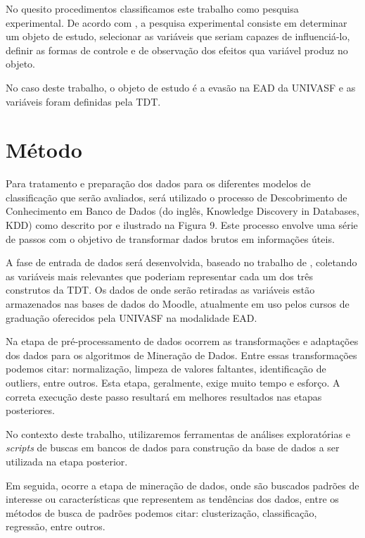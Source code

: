 No quesito procedimentos classificamos este trabalho como pesquisa experimental.
De acordo com , a pesquisa experimental consiste em
determinar um objeto de estudo, selecionar as variáveis que seriam capazes de
influenciá-lo, definir as formas de controle e de observação dos efeitos  qua
variável produz no objeto.

No caso deste trabalho, o objeto de estudo é a evasão na EAD da UNIVASF e as
variáveis foram definidas pela TDT.

\section{Método}

Para tratamento e preparação dos dados para os diferentes modelos de
classificação que serão avaliados, será utilizado o processo de Descobrimento de
Conhecimento em Banco de Dados (do inglês, Knowledge Discovery in Databases,
KDD) como descrito por  e ilustrado na Figura 9.
Este processo envolve uma série de passos com o objetivo de transformar dados
brutos em informações úteis.


A fase de entrada de dados será desenvolvida, baseado no trabalho de
, coletando as variáveis mais relevantes que
poderiam representar cada um dos três construtos da TDT. Os dados de onde serão
retiradas as variáveis estão armazenados nas bases de dados do Moodle,
atualmente em uso pelos cursos de graduação oferecidos pela UNIVASF na
modalidade EAD.

Na etapa de pré-processamento de dados ocorrem as transformações e adaptações
dos dados para os algoritmos de Mineração de Dados. Entre essas transformações
podemos citar: normalização, limpeza de valores faltantes, identificação de
outliers, entre outros. Esta etapa, geralmente, exige muito tempo e esforço. A
correta execução deste passo resultará em melhores resultados nas etapas
posteriores.

No contexto deste trabalho, utilizaremos ferramentas de análises exploratórias e
\textit{scripts} de buscas em bancos de dados para construção da base de dados a
ser utilizada na etapa posterior.

Em seguida, ocorre a etapa de mineração de dados, onde são buscados padrões de
interesse ou características que representem as tendências dos dados, entre os
métodos de busca de padrões podemos citar: clusterização, classificação,
regressão, entre outros.

